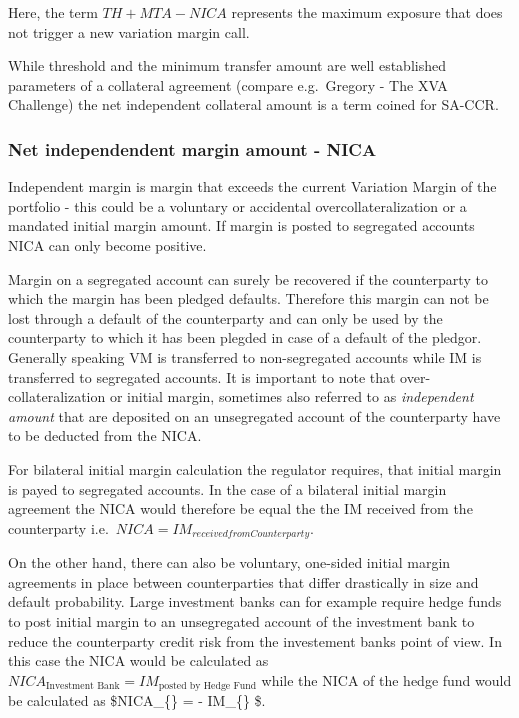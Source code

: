 \documentclass[11pt]{article}
\begin{document}
Here, the term \(TH+MTA-NICA\) represents the maximum exposure that does
not trigger a new variation margin call.

While threshold and the minimum transfer amount are well established
parameters of a collateral agreement (compare e.g.~Gregory - The XVA
Challenge) the net independent collateral amount is a term coined for
SA-CCR.

\hypertarget{net-independendent-margin-amount---nica}{%
\subsubsection{Net independendent margin amount -
NICA}\label{net-independendent-margin-amount---nica}}

Independent margin is margin that exceeds the current Variation Margin
of the portfolio - this could be a voluntary or accidental
overcollateralization or a mandated initial margin amount. If margin is
posted to segregated accounts NICA can only become positive.

Margin on a segregated account can surely be recovered if the
counterparty to which the margin has been pledged defaults. Therefore
this margin can not be lost through a default of the counterparty and
can only be used by the counterparty to which it has been plegded in
case of a default of the pledgor. Generally speaking VM is transferred
to non-segregated accounts while IM is transferred to segregated
accounts. It is important to note that over-collateralization or initial
margin, sometimes also referred to as \emph{independent amount} that are
deposited on an unsegregated account of the counterparty have to be
deducted from the NICA.

For bilateral initial margin calculation the regulator requires, that
initial margin is payed to segregated accounts. In the case of a
bilateral initial margin agreement the NICA would therefore be equal the
the IM received from the counterparty
i.e.~\(NICA = IM_{received from Counterparty}\).

On the other hand, there can also be voluntary, one-sided initial margin
agreements in place between counterparties that differ drastically in
size and default probability. Large investment banks can for example
require hedge funds to post initial margin to an unsegregated account of
the investment bank to reduce the counterparty credit risk from the
investement banks point of view. In this case the NICA would be
calculated as
\(NICA_{\text{Investment Bank}} = IM_{\text{posted by Hedge Fund}}\)
while the NICA of the hedge fund would be calculated as
\$NICA\_\{\} = - IM\_\{\}
\$.
\end{document}
